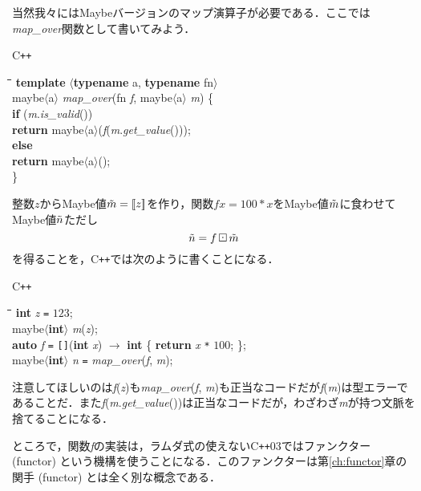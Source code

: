 \documentclass[twocolumn]{jsbook}
\def\[{[\![}
\def\]{]\!]}
\newcommand{\cxx}{\textrm{C}\texttt{++}}
\newenvironment{cxxcode}{\begin{itembox}[r]{\cxx}}{\end{itembox}}
\newenvironment{python}{\begin{tabbing}\hspace*{1em}\=\hspace*{1em}\=\hspace*{1em}\=\hspace*{1em}\=\kill}{\end{tabbing}}
\newcommand{\pthnClassname}[1]{\textrm{#1}}
\newcommand{\pthnId}[1]{\textit{#1}}
\newcommand{\pthnKeyword}[1]{\textbf{#1}}
\newcommand{\pthnOp}[1]{\texttt{#1}}
\DeclareMathOperator{\hsklMaybeMap}{\boxdot}
\newcommand{\hsklJust}[1]{\[#1\]}
\newcommand{\hsklMaybe}[1]{\Tilde{#1}}
\begin{document}
当然我々にはMaybeバージョンのマップ演算子が必要である．ここでは\pthnId{map\_over}関数として書いてみよう．
\begin{cxxcode}
\begin{python}
\pthnKeyword{template} $\langle$\pthnKeyword{typename} \pthnClassname{a}, \pthnKeyword{typename} \pthnClassname{fn}$\rangle$\\
\pthnClassname{maybe}$\langle$\pthnClassname{a}$\rangle$ \pthnId{map\_over}(\pthnClassname{fn} \pthnId{f}, \pthnClassname{maybe}$\langle$\pthnClassname{a}$\rangle$ \pthnId{m}) \{\\
\>\pthnKeyword{if} (\pthnId{m}.\pthnId{is\_valid}())\\
\>\>\pthnKeyword{return} \pthnClassname{maybe}$\langle$\pthnClassname{a}$\rangle$(\pthnId{f}(\pthnId{m}.\pthnId{get\_value}()));\\
\>\pthnKeyword{else}\\
\>\>\pthnKeyword{return} \pthnClassname{maybe}$\langle$\pthnClassname{a}$\rangle$();\\
\}
\end{python}
\end{cxxcode}

整数$z$からMaybe値$\hsklMaybe{m}=\hsklJust{z}$を作り，関数$fx=100*x$をMaybe値$\hsklMaybe{m}$に食わせてMaybe値$\hsklMaybe{n}$ただし$$\hsklMaybe{n}=f\hsklMaybeMap\hsklMaybe{m}$$を得ることを，\cxx では次のように書くことになる．
\begin{cxxcode}
\begin{python}
\pthnKeyword{int} \pthnId{z} \pthnOp{=} $123$;\\
\pthnClassname{maybe}$\langle$\pthnKeyword{int}$\rangle$ \pthnId{m}(\pthnId{z});\\
\pthnKeyword{auto} \pthnId{f} \pthnOp{=} \pthnOp{[]}(\pthnKeyword{int} \pthnId{x}) $\rightarrow$ \pthnKeyword{int} \{ \pthnKeyword{return} \pthnId{x} \pthnOp{*} $100$; \};\\
\pthnClassname{maybe}$\langle$\pthnKeyword{int}$\rangle$ \pthnId{n} \pthnOp{=} \pthnId{map\_over}(\pthnId{f}, \pthnId{m});
\end{python}
\end{cxxcode}
注意してほしいのは\pthnId{f}(\pthnId{z})も\pthnId{map\_over}(\pthnId{f}, \pthnId{m})も正当なコードだが\pthnId{f}(\pthnId{m})は型エラーであることだ．また\pthnId{f}(\pthnId{m}.\pthnId{get\_value}())は正当なコードだが，わざわざ\pthnId{m}が持つ文脈を捨てることになる．

ところで，関数\pthnId{f}の実装は，ラムダ式の使えない\cxx03ではファンクター (functor) という機構を使うことになる．このファンクターは第\ref{ch:functor}章の関手 (functor) とは全く別な概念である．
\end{document}
